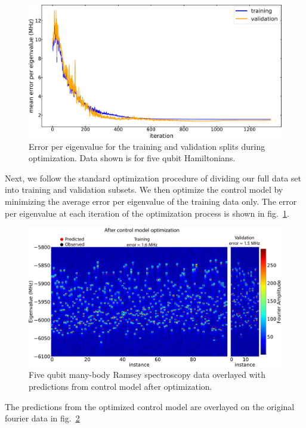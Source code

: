 \begin{figure}[h]
    \begin{center}
        \includegraphics[width=150 mm]{./PDF/tv_error_during_opt.pdf}
    \end{center}
        \caption{
        Error per eigenvalue for the training and validation splits during optimization.
        Data shown is for five qubit Hamiltonians.
        }
    \label{error_during_optimization_training_validation}
\end{figure}
Next, we follow the standard optimization procedure of dividing our full data set into training and validation subsets.
We then optimize the control model by minimizing the average error per eigenvalue of the training data only.
The error per eigenvalue at each iteration of the optimization process is shown in fig.~\ref{error_during_optimization_training_validation}.
\begin{figure}[h]
    \begin{center}
        \includegraphics[width=150 mm]{./PDF/fourier_amp_2d_tv_post_v2.pdf}
    \end{center}
        \caption{
        Five qubit many-body Ramsey spectroscopy data overlayed with predictions from control model after optimization.
        }
    \label{mbr_benchmark_post_optimization}
\end{figure}
The predictions from the optimized control model are overlayed on the original fourier data in fig.~\ref{mbr_benchmark_post_optimization}

